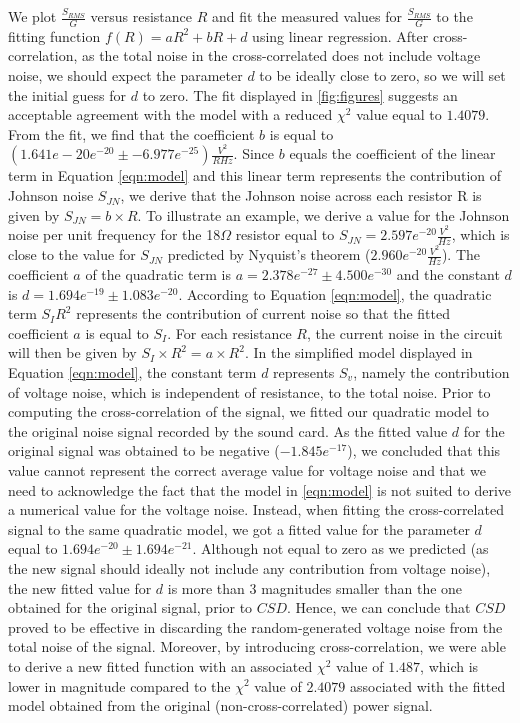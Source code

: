\begin{linenumbers}
We plot $ \frac{S_{RMS}}{G}$ versus resistance $R$ and fit the measured values for $\frac{S_{RMS}}{G}$ to the fitting function $f(R)=aR^2+bR+d$ using linear regression. After cross-correlation, as the total noise in the cross-correlated does not include voltage noise, we should expect the parameter $d$ to be ideally close to zero, so we will set the initial guess for $d$ to zero. The fit displayed in \ref{fig:figures} suggests an acceptable agreement with the model with a reduced $\chi^2$ value equal to $1.4079$. From the fit, we find that the coefficient $b$ is equal to $(1.641e-20 e^{-20} \pm - 6.977e^{-25})\frac{V^2}{RHz}$. Since $b$ equals the coefficient of the linear term in Equation \ref{eqn:model} and this linear term represents the contribution of Johnson noise $S_{JN}$, we derive that the Johnson noise across each resistor R is given by  $S_{JN}=b\times R$. To illustrate an example, we derive a value for the Johnson noise per unit frequency for the 18$\Omega$ resistor equal to $S_{JN}= 2.597e^{-20}\frac{V^2}{Hz}$, which is close to the value for $S_{JN}$ predicted by Nyquist's theorem ($2.960e^{-20}\frac{V^2}{Hz}$). The coefficient $a$ of the quadratic term is $a=2.378e^{-27} \pm 4.500e^{-30}$ and the constant $d$ is $d=1.694e^{-19} \pm 1.083e^{-20}$. According to Equation \ref{eqn:model}, the quadratic term $S_IR^2$ represents the contribution of current noise so that the fitted coefficient $a$ is equal to $S_I$. For each resistance $R$, the current noise in the circuit will then be given by $S_I\times R^2=a\times R^2$. In the simplified model displayed in Equation \ref{eqn:model}, the constant term $d$ represents $S_v$, namely the contribution of voltage noise, which is independent of resistance, to the total noise. 
Prior to computing the cross-correlation of the signal, we fitted our quadratic model to the original noise signal recorded by the sound card. As the fitted value $d$ for the original signal was obtained to be negative ($-1.845e^{-17}$), we concluded that this value cannot represent the correct average value for voltage noise and that we need to acknowledge the fact that the model in \ref{eqn:model} is not suited to derive a numerical value for the voltage noise. Instead, when fitting the cross-correlated signal to the same quadratic model, we got a fitted value for the parameter $d$ equal to $ 1.694e^{-20} \pm  1.694e^{-21}$. Although not equal to zero as we predicted (as the new signal should ideally not include any contribution from voltage noise), the new fitted value for $d$ is more than 3 magnitudes smaller than the one obtained for the original signal, prior to $CSD$. Hence, we can conclude that $CSD$ proved to be effective in discarding the random-generated voltage noise from the total noise of the signal. Moreover, by introducing cross-correlation, we were able to derive a new fitted function with an associated $\chi^2$ value of $1.487$, which is lower in magnitude compared to the $\chi^2$ value of $2.4079$ associated with the fitted model obtained from the original (non-cross-correlated) power signal. 


\end{linenumbers}
